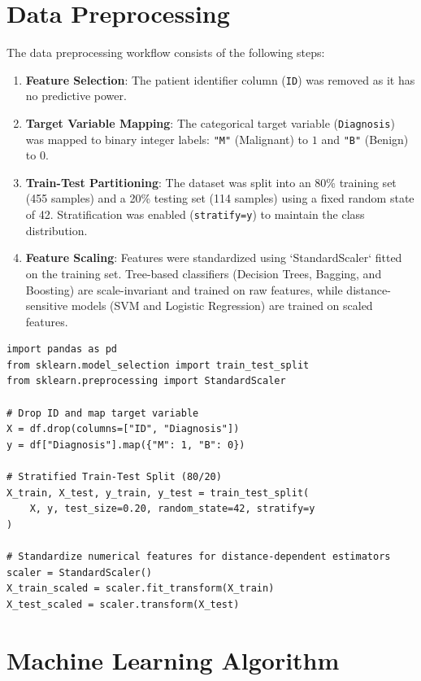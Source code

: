 \documentclass[12pt,a4paper]{article}
\begin{document}
\section{Data Preprocessing}
The data preprocessing workflow consists of the following steps:
\begin{enumerate}
    \item \textbf{Feature Selection}: The patient identifier column (\texttt{ID}) was removed as it has no predictive power.
    \item \textbf{Target Variable Mapping}: The categorical target variable (\texttt{Diagnosis}) was mapped to binary integer labels: \texttt{"M"} (Malignant) to $1$ and \texttt{"B"} (Benign) to $0$.
    \item \textbf{Train-Test Partitioning}: The dataset was split into an 80\% training set (455 samples) and a 20\% testing set (114 samples) using a fixed random state of 42. Stratification was enabled (\texttt{stratify=y}) to maintain the class distribution.
    \item \textbf{Feature Scaling}: Features were standardized using `StandardScaler` fitted on the training set. Tree-based classifiers (Decision Trees, Bagging, and Boosting) are scale-invariant and trained on raw features, while distance-sensitive models (SVM and Logistic Regression) are trained on scaled features.
\end{enumerate}

\begin{lstlisting}[caption={Dataset Preprocessing, Split, and Scaling Code}]
import pandas as pd
from sklearn.model_selection import train_test_split
from sklearn.preprocessing import StandardScaler

# Drop ID and map target variable
X = df.drop(columns=["ID", "Diagnosis"])
y = df["Diagnosis"].map({"M": 1, "B": 0})

# Stratified Train-Test Split (80/20)
X_train, X_test, y_train, y_test = train_test_split(
    X, y, test_size=0.20, random_state=42, stratify=y
)

# Standardize numerical features for distance-dependent estimators
scaler = StandardScaler()
X_train_scaled = scaler.fit_transform(X_train)
X_test_scaled = scaler.transform(X_test)
\end{lstlisting}

\section{Machine Learning Algorithm}
\end{document}
